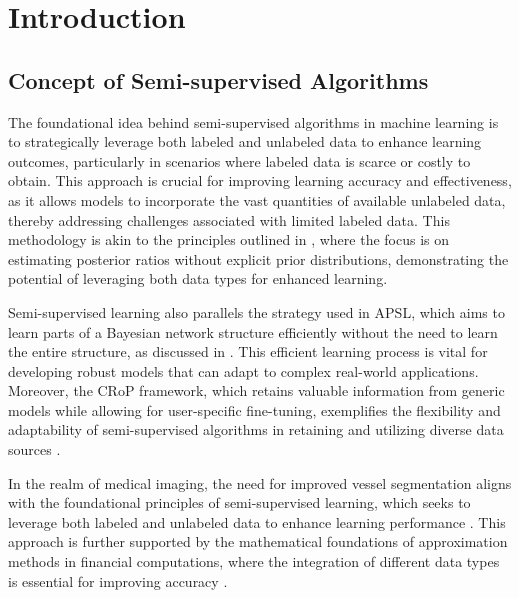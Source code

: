 \section{Introduction} \label{sec:Introduction}


\subsection{Concept of Semi-supervised Algorithms} \label{subsec:Concept of Semi-supervised Algorithms}

The foundational idea behind semi-supervised algorithms in machine learning is to strategically leverage both labeled and unlabeled data to enhance learning outcomes, particularly in scenarios where labeled data is scarce or costly to obtain. This approach is crucial for improving learning accuracy and effectiveness, as it allows models to incorporate the vast quantities of available unlabeled data, thereby addressing challenges associated with limited labeled data. This methodology is akin to the principles outlined in \cite{liu2020posteriorratioestimationlatent}, where the focus is on estimating posterior ratios without explicit prior distributions, demonstrating the potential of leveraging both data types for enhanced learning.



Semi-supervised learning also parallels the strategy used in APSL, which aims to learn parts of a Bayesian network structure efficiently without the need to learn the entire structure, as discussed in \cite{ling2021bayesiannetworkstructurelearning}. This efficient learning process is vital for developing robust models that can adapt to complex real-world applications. Moreover, the CRoP framework, which retains valuable information from generic models while allowing for user-specific fine-tuning, exemplifies the flexibility and adaptability of semi-supervised algorithms in retaining and utilizing diverse data sources \cite{kaur2024cropcontextwiserobuststatic}.



In the realm of medical imaging, the need for improved vessel segmentation aligns with the foundational principles of semi-supervised learning, which seeks to leverage both labeled and unlabeled data to enhance learning performance \cite{shin2018deepvesselsegmentationlearning}. This approach is further supported by the mathematical foundations of approximation methods in financial computations, where the integration of different data types is essential for improving accuracy \cite{kun2022mathematicalfoundationsregressionmethods}.



